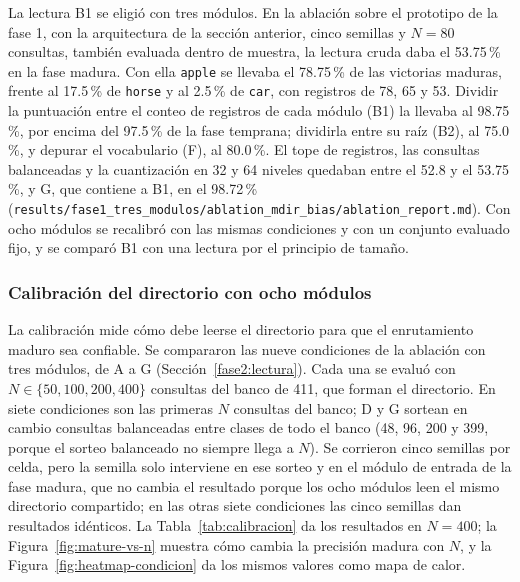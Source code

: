 La lectura B1 se eligió con tres módulos.
En la ablación sobre el prototipo de la fase 1, con la arquitectura de la sección anterior, cinco semillas
y $N = 80$ consultas, también evaluada dentro de muestra, la lectura cruda daba el
53.75\,\% en la fase madura.
Con ella \texttt{apple} se llevaba el 78.75\,\% de las victorias maduras, frente al
17.5\,\% de \texttt{horse} y al 2.5\,\% de \texttt{car}, con registros de 78, 65 y 53.
Dividir la puntuación entre el conteo de registros de cada módulo (B1) la llevaba al
98.75\,\%, por encima del 97.5\,\% de la fase temprana; dividirla entre su raíz (B2), al
75.0\,\%, y depurar el vocabulario (F), al 80.0\,\%.
El tope de registros, las consultas balanceadas y la cuantización en 32 y 64 niveles
quedaban entre el 52.8 y el 53.75\,\%, y G, que contiene a B1, en el 98.72\,\%
(\texttt{results/fase1\_tres\_modulos/ablation\_mdir\_bias/ablation\_report.md}).
Con ocho módulos se recalibró con las mismas condiciones y con un conjunto evaluado
fijo, y se comparó B1 con una lectura por el principio de tamaño.

\subsubsection{Calibración del directorio con ocho módulos}
\label{sec:calibracion}

La calibración mide cómo debe leerse el directorio para que el enrutamiento maduro sea
confiable.
Se compararon las nueve condiciones de la ablación con tres módulos, de A a G
(Sección~\ref{fase2:lectura}).
Cada una se evaluó con $N \in \{50, 100, 200, 400\}$ consultas del banco de 411, que
forman el directorio.
En siete condiciones son las primeras $N$ consultas del banco; D y G sortean en cambio
consultas balanceadas entre clases de todo el banco (48, 96, 200 y 399, porque el
sorteo balanceado no siempre llega a $N$).
Se corrieron cinco semillas por celda, pero la semilla solo interviene en ese sorteo y
en el módulo de entrada de la fase madura, que no cambia el resultado porque los ocho
módulos leen el mismo directorio compartido; en las otras siete condiciones las cinco
semillas dan resultados idénticos.
La Tabla~\ref{tab:calibracion} da los resultados en $N = 400$; la
Figura~\ref{fig:mature-vs-n} muestra cómo cambia la precisión madura con $N$, y la
Figura~\ref{fig:heatmap-condicion} da los mismos valores como mapa de calor.

